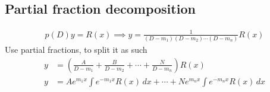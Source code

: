 \documentclass[oneside,11pt,pdftex,final]{book}%
\numberwithin{equation}{section}
\newtheorem{example}[theorem]{Example}
\numberwithin{section}{chapter}
\numberwithin{equation}{chapter}
\begin{document}

\subsection{Partial fraction decomposition}
\begin{align*}
	p(D)y=R(x)\implies y=\frac{1}{(D-m_1)(D-m_2)\cdots (D-m_n)}R(x)
\end{align*}
Use partial fractions, to split it as such
\begin{align*} 
	y&=\left(\frac{A}{D-m_1}+\frac{B}{D-m_2}+\cdots+\frac{N}{D-m_n}\right)R(x)\\
	y&=Ae^{m_1 x}\int e^{-m_1x}R(x)\, dx +\cdots +Ne^{m_nx} \int e^{-m_nx}R(x)\, dx
\end{align*}
\end{document}
